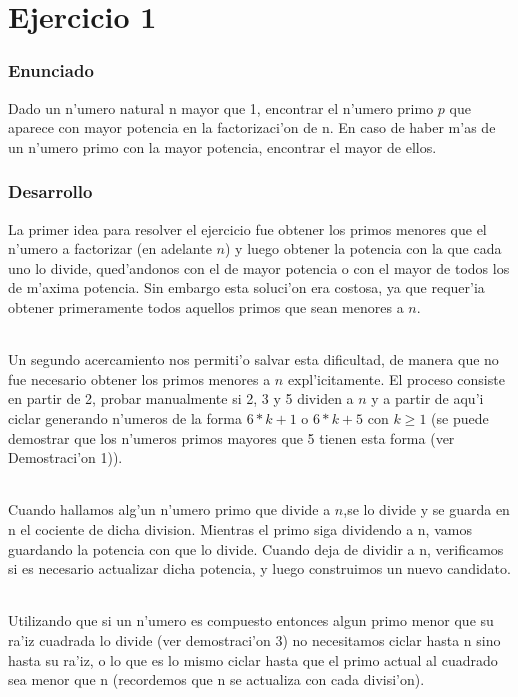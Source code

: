 \part{Ejercicio 1}
\section{Enunciado}
Dado un n'umero natural n mayor que 1, encontrar el n'umero primo $p$ que aparece con mayor potencia en la factorizaci'on 
de n. En caso de haber m'as de un n'umero primo con  la mayor potencia, encontrar el mayor de ellos.

\section{Desarrollo}
La primer idea para resolver el ejercicio fue obtener los primos menores que el n'umero a factorizar
(en adelante $n$) y luego obtener la potencia con la que cada uno lo divide, qued'andonos con el de mayor
potencia o con el mayor de todos los de m'axima potencia. Sin embargo esta soluci'on era costosa, ya que
requer'ia obtener primeramente todos aquellos primos que sean menores a $n$.
\paragraph{}
Un segundo acercamiento nos permiti'o salvar esta dificultad, de manera que no fue necesario obtener 
los primos menores a $n$ expl'icitamente. El proceso consiste en partir de 2, probar manualmente si 2, 3 y 5 
dividen a $n$ y a partir  de aqu'i ciclar generando n'umeros de la forma $6*k + 1$ o $6*k + 5$ con $k \geq 1$ 
(se puede demostrar que los n'umeros primos mayores que 5 tienen esta forma (ver Demostraci'on 1)).
\paragraph{}
Cuando hallamos alg'un n'umero primo que divide a $n$,se lo divide y se guarda en n el cociente de dicha division. Mientras el primo siga dividendo a n, vamos guardando la potencia con que lo divide. Cuando deja de dividir a n, verificamos si es necesario actualizar dicha potencia, y luego construimos un nuevo candidato. 
\paragraph{}
Utilizando que si un n'umero es compuesto entonces algun primo menor que su ra'iz cuadrada lo divide (ver demostraci'on 3) no necesitamos ciclar hasta n sino hasta su ra'iz, o lo que es lo mismo ciclar hasta que el primo actual al cuadrado sea menor que n (recordemos que n se actualiza con cada divisi'on).
